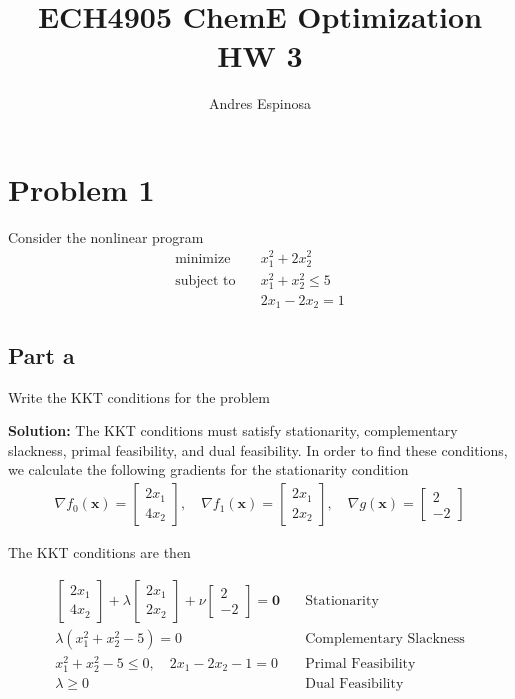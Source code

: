 \documentclass[11pt]{article}
\title{ECH4905 ChemE Optimization HW 3}
\author{Andres Espinosa}
\begin{document}
\maketitle

\section{Problem 1}
Consider the nonlinear program
\begin{align*}
  \text{minimize} & \quad x_1^2 + 2x_2^2 \\
  \text{subject to} & \quad x_1^2 + x_2^2 \leq 5 \\
  & \quad 2x_1 - 2x_2 = 1
\end{align*}

\subsection{Part a}
Write the KKT conditions for the problem
\label{p1:kkt}

\textbf{Solution: }
The KKT conditions must satisfy stationarity, complementary slackness, primal feasibility, and dual feasibility.
In order to find these conditions, we calculate the following gradients for the stationarity condition
\begin{align*}
  \nabla f_0(\textbf{x}) =
  \begin{bmatrix}
    2x_1 \\ 4x_2
  \end{bmatrix}
  , \quad
  \nabla f_1(\textbf{x}) = 
  \begin{bmatrix}
    2x_1 \\ 2x_2
  \end{bmatrix}
  , \quad
  \nabla g(\textbf{x}) = 
  \begin{bmatrix}
    2 \\ -2
  \end{bmatrix}
\end{align*}

The KKT conditions are then

\begin{align*}
  \begin{bmatrix}
    2x_1 \\ 4x_2
  \end{bmatrix}
  +
  \lambda
  \begin{bmatrix}
    2x_1 \\ 2x_2
  \end{bmatrix}
  +
  \nu
  \begin{bmatrix}
    2 \\ -2
  \end{bmatrix}
  = \textbf{0}
  & \quad \text{Stationarity} \\
  \lambda (x_1^2 + x_2^2 - 5) = 0 
  & \quad \text{Complementary Slackness} \\
  x_1^2 + x_2^2 - 5 \leq 0, \quad 2x_1 - 2x_2 - 1 = 0
  & \quad \text{Primal Feasibility} \\
  \lambda \geq 0 
  & \quad \text{Dual Feasibility}
\end{align*}
\end{document}
